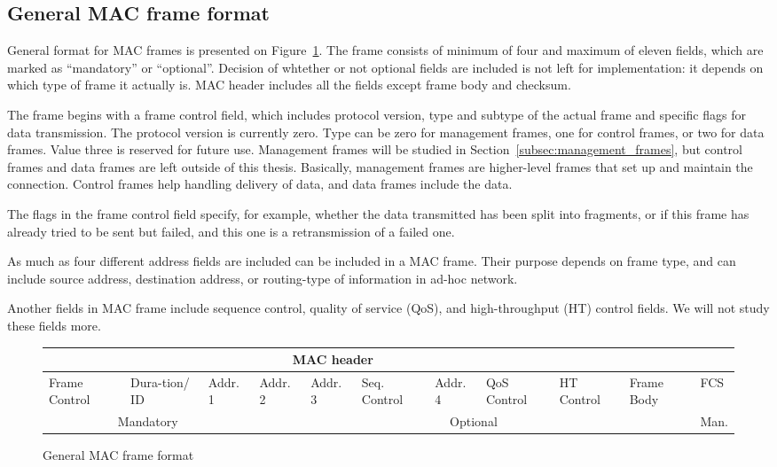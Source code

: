 \documentclass[12pt,a4paper,oneside,pdftex]{report}
\begin{document}
\subsection{General MAC frame format}

General format for MAC frames is presented on Figure~\ref{fig:general_mac_frame}. The frame consists of minimum of four and maximum of eleven fields, which are marked as ``mandatory'' or ``optional''. Decision of whtether or not optional fields are included is not left for implementation: it depends on which type of frame it actually is. MAC header includes all the fields except frame body and checksum.

The frame begins with a frame control field, which includes protocol version, type and subtype of the actual frame and specific flags for data transmission. The protocol version is currently zero. Type can be zero for management frames, one for control frames, or two for data frames. Value three is reserved for future use. Management frames will be studied in Section~\ref{subsec:management_frames}, but control frames and data frames are left outside of this thesis. Basically, management frames are higher-level frames that set up and maintain the connection. Control frames help handling delivery of data, and data frames include the data.

The flags in the frame control field specify, for example, whether the data transmitted has been split into fragments, or if this frame has already tried to be sent but failed, and this one is a retransmission of a failed one.

As much as four different address fields are included can be included in a MAC frame. Their purpose depends on frame type, and can include source address, destination address, or routing-type of information in ad-hoc network.

Another fields in MAC frame include sequence control, quality of service (QoS), and high-throughput (HT) control fields. We will not study these fields more.

\begin{figure}
    \label{fig:general_mac_frame}
    \begin{tabular}{|p{1cm}|p{1cm}|p{1cm}|p{1cm}|p{1cm}|p{1cm}|p{1cm}|p{1cm}|p{1cm}|p{1cm}|p{0.8cm}|}
    
        \multicolumn{9}{|c|}{MAC header} &
        \multicolumn{2}{c|}{ } \\
    \hline 
        Frame Control &
        Dura-tion/ ID &
        Addr. 1 &
        Addr. 2 &
        Addr. 3 &
        Seq. Control &
        Addr. 4 &
        QoS Control &
        HT Control &
        Frame Body &
        FCS \\
    \hline 
        \multicolumn{3}{|c|}{Mandatory} &
        \multicolumn{7}{c|}{Optional} &
        Man. \\

    \end{tabular}

    \caption{General MAC frame format}
\end{figure}
\end{document}
